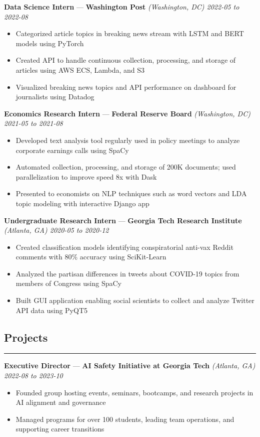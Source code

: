 \documentclass[10pt]{article}
\newcommand{\resumeHeading}[1]{
    \subsection*{#1}
    \hrule
    \vspace*{5pt}
}
\newcommand{\resumeSubHeading}[5]{
    \vspace*{5pt}
    \textbf{#1} — \textbf{#2} \textsl{(#3) \hfill #4 to #5}
}
\begin{document}
\resumeSubHeading
    {Data Science Intern}
    {Washington Post}
    {Washington, DC}
    {2022-05}
    {2022-08}
\begin{itemize}
    \item Categorized article topics in breaking news stream with LSTM and BERT models using PyTorch
    \item Created API to handle continuous collection, processing, and storage of articles using AWS ECS, Lambda, and S3
    \item Visualized breaking news topics and API performance on dashboard for journalists using Datadog
\end{itemize}

\resumeSubHeading
    {Economics Research Intern}
    {Federal Reserve Board}
    {Washington, DC}
    {2021-05}
    {2021-08}
\begin{itemize}
    \item Developed text analysis tool regularly used in policy meetings to analyze corporate earnings calls using SpaCy
    \item Automated collection, processing, and storage of 200K documents; used parallelization to improve speed 8x with Dask
    \item Presented to economists on NLP techniques such as word vectors and LDA topic modeling with interactive Django app
\end{itemize}

\resumeSubHeading
    {Undergraduate Research Intern}
    {Georgia Tech Research Institute}
    {Atlanta, GA}
    {2020-05}
    {2020-12}
\begin{itemize}
    \item Created classification models identifying conspiratorial anti-vax Reddit comments with 80\% accuracy using SciKit-Learn
    \item Analyzed the partisan differences in tweets about COVID-19 topics from members of Congress using SpaCy
    \item Built GUI application enabling social scientists to collect and analyze Twitter API data using PyQT5
\end{itemize}



\resumeHeading{Projects \vspace{-2.5pt}}

\resumeSubHeading
    {Executive Director}
    {AI Safety Initiative at Georgia Tech}
    {Atlanta, GA}
    {2022-08}
    {2023-10}
\begin{itemize}
    \item Founded group hosting events, seminars, bootcamps, and research projects in AI alignment and governance
    \item Managed programs for over 100 students, leading team operations, and supporting career transitions
\end{itemize}
\end{document}
